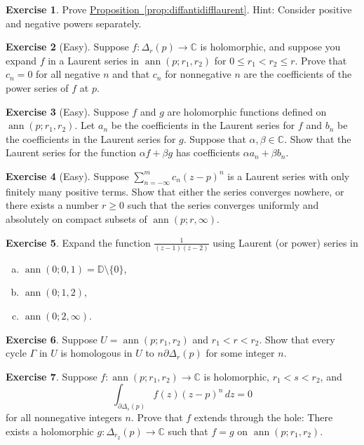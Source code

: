 \documentclass[12pt,openany]{book}
\newcommand{\ann}{\operatorname{ann}}
\newcommand{\C}{{\mathbb{C}}}
\newcommand{\D}{{\mathbb{D}}}
\theoremstyle{plain}
\theoremstyle{remark}
\theoremstyle{definition}
\newenvironment{exbox}{%
    \def\FrameCommand{\vrule width 1pt \relax\hspace{10pt}}%
    \MakeFramed{\advance\hsize-\width\FrameRestore}%
}{%
    \endMakeFramed
}
\newenvironment{exparts}{%
    \leavevmode\begin{enumerate}[a),noitemsep,topsep=0pt,parsep=0pt,partopsep=0pt]
}{%
    \end{enumerate}
}
\theoremstyle{exercise}
\newtheorem{exercise}{Exercise}[section]
\theoremstyle{example}
\newcommand{\propref}[1]{\hyperref[#1]{Proposition~\ref*{#1}}}
\begin{document}
\begin{exbox}
\begin{exercise}
Prove \propref{prop:diffantidifflaurent}.  Hint: Consider positive and
negative powers separately.
\end{exercise}

\begin{exercise}[Easy]
Suppose $f \colon \Delta_r(p) \to \C$ is holomorphic, and suppose you expand
$f$ in a Laurent series in $\ann(p;r_1,r_2)$ for $0 \leq r_1 < r_2 \leq r$.
Prove that $c_n = 0$ for all negative $n$ and that $c_n$ for nonnegative $n$
are the coefficients of the power series of $f$ at $p$.
\end{exercise}

\begin{exercise}[Easy]
Suppose $f$ and $g$ are holomorphic functions defined on
$\ann(p;r_1,r_2)$.  Let $a_n$ be the coefficients in the Laurent series for
$f$ and $b_n$ be the coefficients in the Laurent series for $g$.  Suppose
that $\alpha,\beta \in \C$.  Show that the Laurent series for the function
$\alpha f + \beta g$ has coefficients $\alpha a_n + \beta b_n$.
\end{exercise}

\begin{exercise}[Easy]
Suppose $\sum_{n=-\infty}^m c_n {(z-p)}^n$ is a Laurent series with only
finitely many positive terms.  Show that either the series converges
nowhere, or there exists a number $r \geq 0$ such that the series
converges uniformly and absolutely on compact subsets of
$\ann(p;r,\infty)$.
\end{exercise}

\begin{exercise}
Expand the function $\frac{1}{(z-1)(z-2)}$ using Laurent (or power) series in 
\begin{exparts}
\item $\ann(0;0,1) = \D \setminus \{ 0 \}$,
\item $\ann(0;1,2)$,
\item $\ann(0;2,\infty)$.
\end{exparts}
\end{exercise}

\begin{exercise}
Suppose $U = \ann(p;r_1,r_2)$ and $r_1 < r < r_2$.
Show that every cycle $\Gamma$ in $U$ is homologous in $U$
to $n \partial \Delta_r(p)$ for some integer $n$.
\end{exercise}

\begin{exercise}
Suppose $f \colon \ann(p;r_1,r_2) \to \C$ is holomorphic,
$r_1 < s < r_2$, and
\begin{equation*}
\int_{\partial \Delta_{s}(p)} f(z){(z-p)}^n
 \, dz = 0
\end{equation*}
for all nonnegative integers $n$.  Prove that $f$ extends through the hole:
There exists a holomorphic $g \colon \Delta_{r_2}(p) \to \C$ such that 
$f = g$ on $\ann(p;r_1,r_2)$.
\end{exercise}


\end{exbox}
\end{document}
